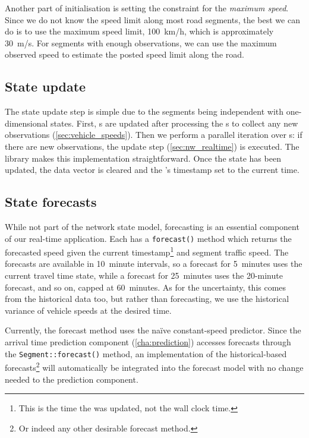 Another part of initialisation is setting the constraint for the \emph{maximum speed}. Since we do not know the speed limit along most road segments, the best we can do is to use the maximum speed limit, 100~km/h, which is approximately 30~m/s. For segments with enough observations, we can use the maximum observed speed to estimate the posted speed limit along the road.



\subsection{State update}
\label{sec:nw_implementation_update}

The state update step is simple due to the segments being independent with one-dimensional states. First, s are updated after processing the s to collect any new observations (\cref{sec:vehicle_speeds}). Then we perform a parallel iteration over s: if there are new observations, the update step (\cref{sec:nw_realtime}) is executed. The  library makes this implementation straightforward. Once the state has been updated, the data vector is cleared and the 's timestamp set to the current time.


\subsection{State forecasts}
\label{sec:nw_implementation_forecast}

While not part of the network state model, forecasting is an essential component of our real-time application. Each  has a \verb+forecast()+ method which returns the forecasted speed given the current timestamp\footnote{This is the time the  was updated, not the wall clock time.} and segment traffic speed. The forecasts are available in 10~minute intervals, so a forecast for 5~minutes uses the current travel time state, while a forecast for 25~minutes uses the 20-minute forecast, and so on, capped at 60~minutes. As for the uncertainty, this comes from the historical data too, but rather than forecasting, we use the historical variance of vehicle speeds at the desired time.

Currently, the forecast method uses the na\"ive constant-speed predictor. Since the arrival time prediction component (\cref{cha:prediction}) accesses forecasts through the \verb+Segment::forecast()+ method, an implementation of the historical-based forecasts\footnote{Or indeed any other desirable forecast method.} will automatically be integrated into the forecast model with no change needed to the prediction component.
